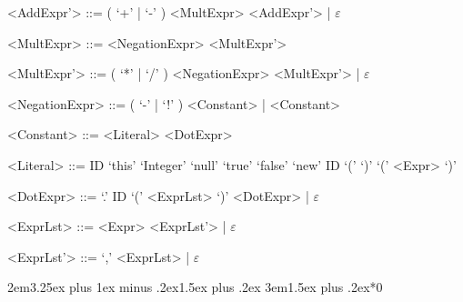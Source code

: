\documentclass{report}
\begin{document}
\begin{grammar}
<AddExpr'> ::= ( `+' | `-' ) <MultExpr> <AddExpr'> | $\varepsilon$

<MultExpr> ::= <NegationExpr> <MultExpr'>

<MultExpr'> ::= ( `*' | `/' ) <NegationExpr> <MultExpr'> | $\varepsilon$

<NegationExpr> ::= ( `-' | `!' ) <Constant> | <Constant>

<Constant> ::= <Literal> <DotExpr>

<Literal> ::= ID
\alt `this'
\alt `Integer'
\alt `null'
\alt `true'
\alt `false'
\alt `new' ID `(' `)'
\alt `(' <Expr> `)'

<DotExpr> ::= `.' ID `(' <ExprLst> `)' <DotExpr> | $\varepsilon$

<ExprLst> ::= <Expr> <ExprLst'> | $\varepsilon$

<ExprLst'> ::= `,' <ExprLst> | $\varepsilon$

\end{grammar}


\titleformat{\subsection}[block]{}{\thesubsection}{1em}{}
\titleformat{\subsubsection}[block]{}{\thesubsubsection}{1em}{}
\titlespacing*{\subsection} {2em}{3.25ex plus 1ex minus .2ex}{1.5ex plus .2ex}
\titlespacing*{\subsubsection} {3em}{1.5ex plus .2ex}{*0}

\newpage
\end{document}
